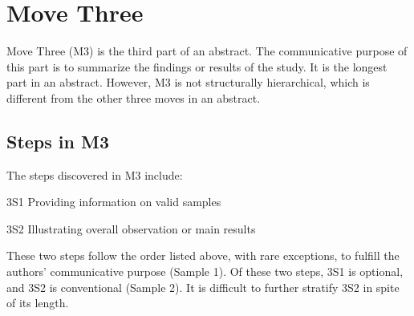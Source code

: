 \documentclass[a4paper]{ctexbook}
\begin{document}
\chapter{Move Three}\label{chapter5}

Move Three (M3) is the third part of an abstract. The communicative purpose of this part is to summarize the findings or results of the study. It is the longest part in an abstract. However, M3 is not structurally hierarchical, which is different from the other three moves in an abstract.

\section{Steps in M3}

The steps discovered in M3 include:

3S1 Providing information on valid samples

3S2 Illustrating overall observation or main results 

These two steps follow the order listed above, with rare exceptions, to fulfill the authors' communicative purpose (Sample 1). Of these two steps, 3S1 is optional, and 3S2 is conventional (Sample 2). It is difficult to further stratify 3S2 in spite of its length.
\end{document}
